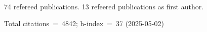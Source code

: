 74 refereed publications. 13 refeered publications as first author.

Total citations~=~4842; h-index~=~37 (2025-05-02)